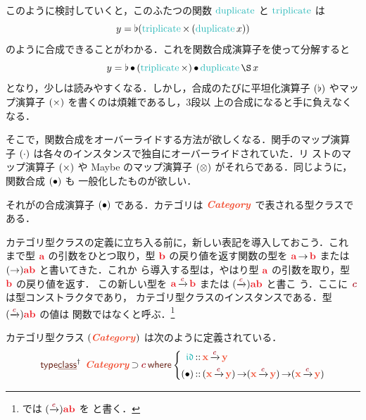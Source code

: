 \documentclass[a5paper,twoside,fleqn,draft]{jsbook}
\begin{document}
このように検討していくと，このふたつの関数 $\mDuplicate$ と
$\mTriplicate$ は
\begin{equation}
  y
  =\mJoinList(\mTriplicate\hMap{}(\mDuplicate x))
\end{equation}
のように合成できることがわかる．これを関数合成演算子を使って分解すると
\begin{equation}
  \label{eq:triplicate-duplicate}
  y
  =\mJoinList\hCompose{}(\mTriplicate\hMap)\hCompose\mDuplicate\hApply x
\end{equation}
となり，少しは読みやすくなる．しかし，合成のたびに平坦化演算子
$(\operatorname{\flat})$ やマップ演算子 $(\operatorname{\times})$ を書くのは煩雑であるし，3段以
上の合成になると手に負えなくなる．

そこで，関数合成をオーバーライドする方法が欲しくなる．関手のマップ演算
子 $(\operatorname{\cdot})$ は各々のインスタンスで独自にオーバーライドされていた．リ
ストのマップ演算子 $(\operatorname{\times})$ や Maybe のマップ演算子
$(\operatorname{\otimes})$ がそれらである．同じように，関数合成 $(\operatorname{\bullet})$ も
一般化したものが欲しい．

それがの合成演算子 $(\operatorname{\bullet})$ である．カテゴリは
$\mCatTypeClass$ で表される型クラスである．

カテゴリ型クラスの定義に立ち入る前に，新しい表記を導入しておこう．これ
まで型 $\hTypeName{a}$ の引数をひとつ取り，型 $\hTypeName{b}$ の戻り値を返す関数の型を
$\hTypeName{a}\hFunctionArrow\hTypeName{b}$ または $(\hFunctionArrow)\hTypeName{a}\hTypeName{b}$ と書いてきた．これか
ら導入する型は，やはり型 $\hTypeName{a}$ の引数を取り，型 $\hTypeName{b}$ の戻り値を返す．
この新しい型を $\hTypeName{a}\mCatArrowC\hTypeName{b}$ または $(\mCatArrowC)\hTypeName{a}\hTypeName{b}$ と書こ
う．ここに $\mTypeConstructor{c}$ は型コンストラクタであり，
カテゴリ型クラスのインスタンスである．型 $(\mCatArrowC)\hTypeName{a}\hTypeName{b}$ の値は
関数ではなくと呼ぶ．\footnote{\haskell では
  $(\mCatArrowC)\hTypeName{a}\hTypeName{b}$ を  と書く．}

カテゴリ型クラス $(\mCatTypeClass)$ は次のように定義されている．
\begin{equation}
  \mTypeClassDeclPolymorphic\;
  \mCatTypeClass\hHasElementsOf\mTypeConstructor{c}
  \mWhere\left\{
  \begin{aligned}
    \mIdCat
    &\hIsTypeOf\mX\mCatArrowC\mY\\
    (\mCompCat)
    &\hIsTypeOf{}(\mX\mCatArrowC\mY)\hFunctionArrow(\mX\mCatArrowC\mY)\hFunctionArrow(\mX\mCatArrowC\mY)
  \end{aligned}
  \right.
\end{equation}
\end{document}
